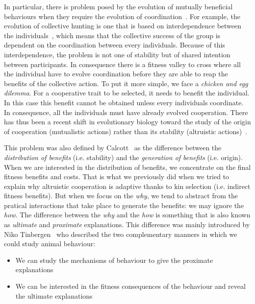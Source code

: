     In particular, there is problem posed by the evolution of mutually beneficial behaviours when they require the evolution of coordination~\parencite{Alvard2001, Alvard2003, Drea2009, Leimar2003}. For example, the evolution of collective hunting is one that is based on interdependence between the individuals~\parencite{Tomasello2012}, which means that the collective success of the group is dependent on the coordination between every individuals. Because of this interdependence, the problem is not one of stability but of shared intention between participants. In consequence there is a fitness valley to cross where all the individual have to evolve coordination before they are able to reap the benefits of the collective action. To put it more simple, we face a \emph{chicken and egg dilemma}. For a cooperative trait to be selected, it needs to benefit the individual. In this case this benefit cannot be obtained unless every individuals coordinate. In consequence, all the individuals must have already evolved cooperation. There has thus been a recent shift in evolutionary biology toward the study of the origin of cooperation (mutualistic actions) rather than its stability (altruistic actions)~\parencite{Forber2015}.

    This problem was also defined by Calcott~\parencite{Calcott2007a} as the difference between the \emph{distribution of benefits} (i.e. stability) and the \emph{generation of benefits} (i.e. origin). When we are interested in the distribution of benefits, we concentrate on the final fitness benefits and costs. That is what we previously did when we tried to explain why altruistic cooperation is adaptive thanks to kin selection (i.e. indirect fitness benefits). But when we focus on the \emph{why}, we tend to abstract from the pratical interactions that take place to generate the benefits: we may ignore the \emph{how}. The difference between the \emph{why} and the \emph{how} is something that is also known as \emph{ultimate} and \emph{proximate} explanations. This difference was mainly introduced by Niko Tinbergen~\parencite{Tinbergen1969, West2007a} who described the two complementary manners in which we could study animal behaviour:

    \begin{itemize}
      \item {We can study the mechanisms of behaviour to give the proximate explanations}
      \item {We can be interested in the fitness consequences of the behaviour and reveal the ultimate explanations}
    \end{itemize}

